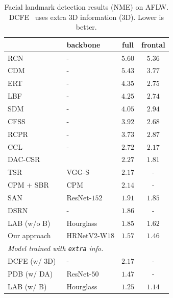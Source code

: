 \documentclass[10pt,journal,compsoc]{IEEEtran}
\begin{document}
\renewcommand{\arraystretch}{1.3}
\begin{table}[!htbp]
\setlength{\tabcolsep}{13pt}
\scriptsize
\centering
\caption{Facial landmark detection results (NME) on AFLW.
DCFE~\cite{ValleBVB18} uses extra $3$D information ($3$D). Lower is better.}
\label{table:comparison_aflw_testset}
\begin{tabular}{l|l|c|c }
\hline \noalign{\smallskip}
 & backbone &  full &  frontal \\
\hline

\hline
RCN \cite{HonariYVP16} &- & $5.60$ & $5.36$\\
CDM \cite{YuHZYM13} & -& $5.43$ & $3.77$\\
ERT \cite{KazemiS14}&- & $4.35$ & $2.75$\\
LBF \cite{RenCW014} & -& $4.25$ & $2.74$\\
SDM \cite{XiongT13} &- & $4.05$ & $2.94$\\
CFSS \cite{ZhuLLT15}&- & $3.92$ & $2.68$ \\
RCPR \cite{Burgos-ArtizzuPD13}&- &$3.73$ & $2.87$\\
CCL \cite{ZhuLLT16}&- &$2.72$ & $2.17$\\
DAC-CSR \cite{FengKC0W17}& &$2.27$ & $1.81$\\
TSR \cite{LvSXCZ17}&VGG-S &$2.17$ & - \\
CPM + SBR \cite{DongYWW0S18}& CPM &$2.14$&-\\
SAN \cite{DongYO018}& ResNet-$152$ &$1.91$ & $1.85$\\
DSRN \cite{MiaoZLDAH18}& - &$1.86$ & -\\
LAB (w/o B) \cite{Wu0YWC018}& Hourglass & $1.85$ & $1.62$\\
\hline
Our approach & HRNetV2-W$18$ & $\mathbf{1.57}$ & $\mathbf{1.46}$ \\
\hline

\hline
\multicolumn{3}{l}{
\emph {Model trained with \texttt{extra} info.}}\\
\hline
DCFE (w/ $3$D)~\cite{ValleBVB18}& - &$2.17$ & - \\
PDB (w/ DA)~\cite{FengKA0W18}& ResNet-$50$&$1.47$ & -\\
LAB (w/ B)~\cite{Wu0YWC018}& Hourglass &$1.25$ & $1.14$\\
\hline
\end{tabular} 
\end{table}
\end{document}
